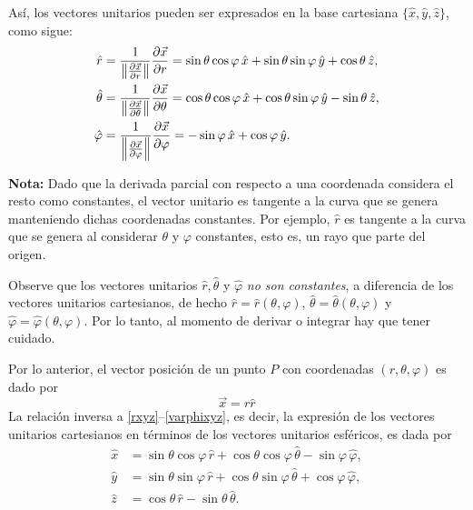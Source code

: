 Así, los vectores unitarios pueden ser expresados en la base cartesiana $\{\hat{x}, \hat{y}, \hat{z}\}$, como sigue:
\begin{align}
    \hat{r} &= \frac{1}{\left\lVert\frac{\partial \Vec{x}}{\partial r}\right\rVert}\frac{\partial \Vec{x}}{\partial r} = \sin \theta \cos \varphi \,\hat{x} + \sin \theta \sin \varphi \,\hat{y} + \cos \theta \,\hat{z}, \label{rxyz} \\
    \hat{\theta} &= \frac{1}{\left\lVert\frac{\partial \Vec{x}}{\partial \theta}\right\rVert}\frac{\partial \Vec{x}}{\partial \theta} = \cos \theta \cos \varphi \,\hat{x} + \cos \theta \sin \varphi \,\hat{y} - \sin \theta   \,\hat{z},  \\
    \hat{\varphi} &= \frac{1}{\left\lVert\frac{\partial \Vec{x}}{\partial \varphi}\right\rVert}\frac{\partial \Vec{x}}{\partial \varphi} = - \sin \varphi \,\hat{x} + \cos \varphi \,\hat{y} . \label{varphixyz}
\end{align}

\textbf{Nota:} Dado que la derivada parcial con respecto a una coordenada considera el resto como constantes, el vector unitario es tangente a la curva que se genera manteniendo dichas coordenadas constantes. Por ejemplo, $\hat{r}$ es tangente a la curva que se genera al considerar $\theta$ y $\varphi$ constantes, esto es, un rayo que parte del origen.

Observe que los vectores unitarios $\hat{r}, \hat{\theta}$ y $\hat{\varphi}$ \textit{no son constantes}, a diferencia de los vectores unitarios cartesianos, de hecho $\hat{r} = \hat{r}(\theta,\varphi)$, $\hat{\theta} = \hat{\theta}(\theta,\varphi)$ y $\hat{\varphi} = \hat{\varphi}(\theta,\varphi)$. Por lo tanto, al momento de derivar o integrar hay que tener cuidado.

Por lo anterior, el vector posición de un punto $P$ con coordenadas $(r, \theta, \varphi)$ es dado por
\begin{equation}
\vec{x} = r \hat{r}
\end{equation}
La relación inversa a \eqref{rxyz}--\eqref{varphixyz}, es decir, la expresión de los vectores unitarios cartesianos en términos de los vectores unitarios esféricos, es dada por
\begin{align}
    \hat{x} &= \sin \theta \cos \varphi \,\hat{r} + \cos \theta \cos \varphi \,\hat{\theta} - \sin \varphi \,\hat{\varphi},\\
    \hat{y} &= \sin \theta \sin\varphi \,\hat{r} + \cos \theta \sin \varphi \,\hat{\theta} + \cos \varphi \,\hat{\varphi}, \\
    \hat{z} &= \cos \theta \,\hat{r} - \sin \theta \,\hat{\theta}.
\end{align}

